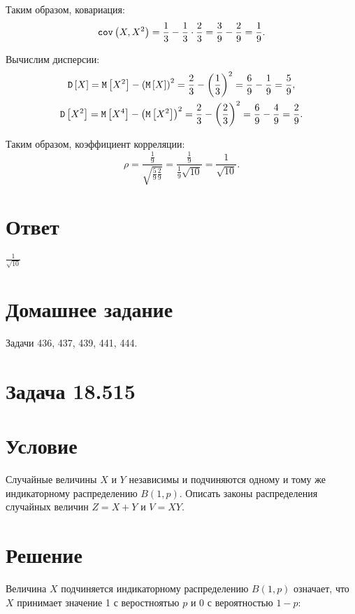 Таким образом, ковариация:
\begin{equation}
    \texttt{cov} \left ( X , X^2 \right ) = \frac{1}{3} - \frac{1}{3} \cdot \frac{2}{3} = \frac{3}{9} - \frac{2}{9} = \frac{1}{9} .
\end{equation}

Вычислим дисперсии:
\begin{gather}
    \mathtt{D} \left [ X \right ] = \mathtt{M} \left [ X^2 \right ] - \left ( \mathtt{M} \left [ X \right ] \right )^2 = \frac{2}{3} - \left ( \frac{1}{3} \right )^2 = \frac{6}{9} - \frac{1}{9} = \frac{5}{9} , \\
    \mathtt{D} \left [ X^2 \right ] = \mathtt{M} \left [ X^4 \right ] - \left ( \mathtt{M} \left [ X^2 \right ] \right )^2 = \frac{2}{3} - \left ( \frac{2}{3} \right )^2 = \frac{6}{9} - \frac{4}{9} = \frac{2}{9}.
\end{gather}

Таким образом, коэффициент корреляции:
\begin{equation}
    \rho = \frac{\frac{1}{9}}{\sqrt{\frac{5}{9} \frac{2}{9}}} = \frac{\frac{1}{9}}{\frac{1}{9} \sqrt{10}} = \frac{1}{\sqrt{10}} .
\end{equation}

\section*{Ответ}
$\frac{1}{\sqrt{10}}$


\section{Домашнее задание}

Задачи 436, 437, 439, 441, 444.


\section{Задача 18.515}
\section*{Условие}
Случайные величины $X$ и $Y$ независимы и подчиняются одному и тому же индикаторному распределению $B(1,p)$. Описать законы распределения случайных величин
$Z = X + Y$ и $V = X Y$.
\section*{Решение}
Величина $X$ подчиняется индикаторному распределению $B(1,p)$ означает, что $X$ принимает значение 1 с веростноятью $p$ и 0 с вероятностью $1-p$:

